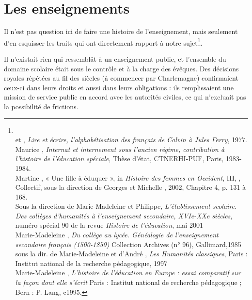  

\section{Les enseignements}

    
   Il n'est pas question ici de faire une histoire de l'enseignement, mais seulement d'en esquisser les traits qui ont directement rapport à notre sujet\footnote{\\ et , \emph{Lire et écrire, l'alphabétisation des français de Calvin à Jules Ferry}, 1977.
\\Maurice {}, \emph{Internat et internement sous l'ancien régime, contribution à l'histoire de l'éducation spéciale}, Thèse d'état, CTNERHI-PUF, Paris, 1983-1984.
\\Martine {}, {« Une fille à éduquer », in \emph{Histoire des femmes en Occident}, III, }, Collectif, sous la direction de Georges  et Michelle , 2002, Chapitre 4, p. 131 à 168.
\\Sous la direction de Marie-Madeleine  et Philippe, \emph{L’établissement scolaire. Des collèges d'humanités à l'enseignement secondaire, XVIe-XXe siècles}, numéro spécial 90 de la revue \emph{Histoire de l’éducation}, mai 2001
\\ Marie-Madeleine , \emph{Du collège au lycée. Généalogie de l'enseignement secondaire français (1500-1850)}
Collection Archives (n° 96), Gallimard,1985 
\\sous la dir. de Marie-Madeleine  et d'André , \emph{Les Humanités classiques}, Paris : Institut national de la recherche pédagogique, 1997
\\Marie-Madeleine ,	\emph{L'histoire de l'éducation en Europe : essai comparatif sur la façon dont elle s'écrit} Paris : Institut national de recherche pédagogique ; Bern : P. Lang, c1995. }.

 
Il n'existait rien qui ressemblât à un enseignement public, et l'ensemble du domaine scolaire était sous le contrôle et à la charge des évêques. Des décisions royales répétées au fil des siècles (à commencer par Charlemagne) confirmaient ceux-ci dans leurs droits et aussi dans leurs obligations : ils remplissaient une mission de service public en accord avec les autorités civiles, ce qui n'excluait pas la possibilité de frictions. 


